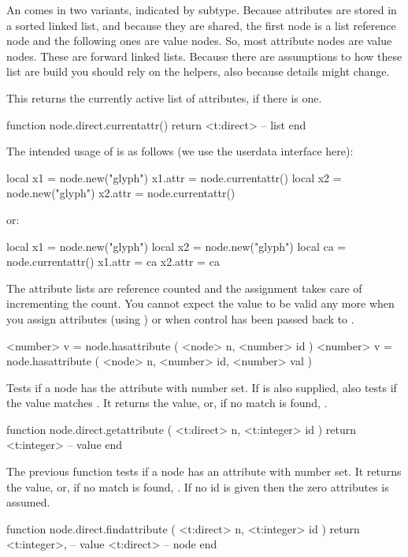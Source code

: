 An  comes in two variants, indicated by subtype. Because
attributes are stored in a sorted linked list, and because they are shared, the
first node is a list reference node and the following ones are value nodes. So,
most attribute nodes are value nodes. These are forward linked lists. Because
there are assumptions to how these list are build you should rely on the helpers,
also because details might change.

This returns the currently active list of attributes, if there is one.

\starttyping[option=LUA]
function node.direct.currentattr()
    return <t:direct> -- list
end
\stoptyping

The intended usage of  is as follows (we use the userdata
interface here):

\starttyping[option=LUA]
local x1 = node.new("glyph")
x1.attr = node.currentattr()
local x2 = node.new("glyph")
x2.attr = node.currentattr()
\stoptyping

or:

\starttyping[option=LUA]
local x1 = node.new("glyph")
local x2 = node.new("glyph")
local ca = node.currentattr()
x1.attr = ca
x2.attr = ca
\stoptyping

The attribute lists are reference counted and the assignment takes care of
incrementing the count. You cannot expect the value  to be valid any
more when you assign attributes (using ) or when control
has been passed back to \TEX.

\starttyping[option=LUA]
<number> v = node.hasattribute ( <node> n, <number> id )
<number> v = node.hasattribute ( <node> n, <number> id, <number> val )
\stoptyping

Tests if a node has the attribute with number  set. If  is
also supplied, also tests if the value matches . It returns the value,
or, if no match is found, .

\starttyping[option=LUA]
function node.direct.getattribute ( <t:direct> n, <t:integer> id )
    return <t:integer> -- value
end
\stoptyping

The previous function tests if a node has an attribute with number 
set. It returns the value, or, if no match is found, . If no \type
{id} is given then the zero attributes is assumed.

%
\starttyping[option=LUA]
function node.direct.findattribute ( <t:direct> n, <t:integer> id )
    return
        <t:integer>, -- value
        <t:direct>   -- node
end
\stoptyping

